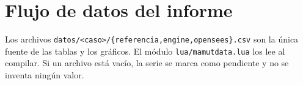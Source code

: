 \section{Flujo de datos del informe}
Los archivos \texttt{datos/<caso>/\{referencia,engine,opensees\}.csv} son la única fuente de las tablas y los gráficos. El módulo \texttt{lua/mamutdata.lua} los lee al compilar. Si un archivo está vacío, la serie se marca como pendiente y no se inventa ningún valor.
